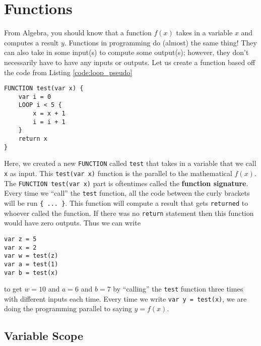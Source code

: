 \documentclass{article}
\begin{document}
\section{Functions}

From Algebra, you should know that a function $f(x)$ takes in a variable $x$ and computes a result $y$.
Functions in programming do (almost) the same thing!
They can also take in some input(s) to compute some output(s); however, they don't necessarily have to have any inputs or outputs.
Let us create a function based off the code from Listing \ref{code:loop_pseudo}

\begin{lstlisting}[caption={Your first function.}, label={code:fn_pseudo}]
FUNCTION test(var x) {
    var i = 0
    LOOP i < 5 {
        x = x + 1
        i = i + 1
    }
    return x
}
\end{lstlisting}

Here, we created a new \lstinline{FUNCTION} called \lstinline{test} that takes in a variable that we call \lstinline{x} as input.
This \lstinline{test(var x)} function is the parallel to the mathematical $f(x)$.
The \lstinline{FUNCTION test(var x)} part is oftentimes called the \textbf{function signature}.
Every time we ``call'' the \lstinline{test} function, all the code between the curly brackets will be run \lstinline|{ ... }|.
This function will compute a result that gets \lstinline{returned} to whoever called the function.
If there was no \lstinline{return} statement then this function would have zero outputs.
Thus we can write
\begin{lstlisting}[caption={Call test.}, label={code:call_fn_pseudo}]
var z = 5
var x = 2
var w = test(z)
var a = test(1)
var b = test(x)
\end{lstlisting}
to get $w = 10$ and $a = 6$ and $b = 7$ by ``calling'' the \lstinline{test} function three times with different inputs each time.
Every time we write \lstinline{var y = test(x)}, we are doing the programming parallel to saying $y = f(x)$.

\subsection{Variable Scope}
\end{document}
